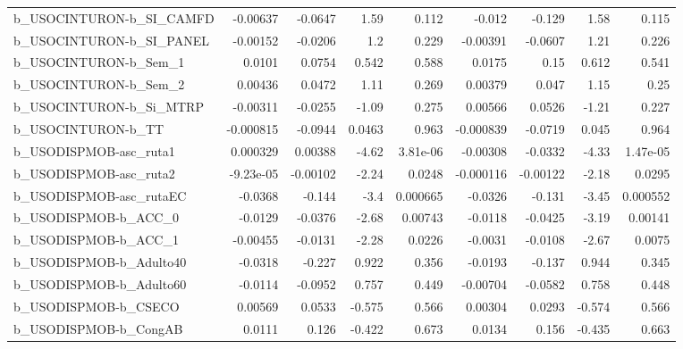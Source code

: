 \begin{tabular}{lrrrrrrrr}
b\_USOCINTURON-b\_SI\_CAMFD   &    -0.00637 &      -0.0647 &     1.59 &    0.112 &     -0.012 &      -0.129 &         1.58 &         0.115 \\
b\_USOCINTURON-b\_SI\_PANEL   &    -0.00152 &      -0.0206 &      1.2 &    0.229 &   -0.00391 &     -0.0607 &         1.21 &         0.226 \\
b\_USOCINTURON-b\_Sem\_1      &      0.0101 &       0.0754 &    0.542 &    0.588 &     0.0175 &        0.15 &        0.612 &         0.541 \\
b\_USOCINTURON-b\_Sem\_2      &     0.00436 &       0.0472 &     1.11 &    0.269 &    0.00379 &       0.047 &         1.15 &          0.25 \\
b\_USOCINTURON-b\_Si\_MTRP    &    -0.00311 &      -0.0255 &    -1.09 &    0.275 &    0.00566 &      0.0526 &        -1.21 &         0.227 \\
b\_USOCINTURON-b\_TT         &   -0.000815 &      -0.0944 &   0.0463 &    0.963 &  -0.000839 &     -0.0719 &        0.045 &         0.964 \\
b\_USODISPMOB-asc\_ruta1     &    0.000329 &      0.00388 &    -4.62 & 3.81e-06 &   -0.00308 &     -0.0332 &        -4.33 &      1.47e-05 \\
b\_USODISPMOB-asc\_ruta2     &   -9.23e-05 &     -0.00102 &    -2.24 &   0.0248 &  -0.000116 &    -0.00122 &        -2.18 &        0.0295 \\
b\_USODISPMOB-asc\_rutaEC    &     -0.0368 &       -0.144 &     -3.4 & 0.000665 &    -0.0326 &      -0.131 &        -3.45 &      0.000552 \\
b\_USODISPMOB-b\_ACC\_0       &     -0.0129 &      -0.0376 &    -2.68 &  0.00743 &    -0.0118 &     -0.0425 &        -3.19 &       0.00141 \\
b\_USODISPMOB-b\_ACC\_1       &    -0.00455 &      -0.0131 &    -2.28 &   0.0226 &    -0.0031 &     -0.0108 &        -2.67 &        0.0075 \\
b\_USODISPMOB-b\_Adulto40    &     -0.0318 &       -0.227 &    0.922 &    0.356 &    -0.0193 &      -0.137 &        0.944 &         0.345 \\
b\_USODISPMOB-b\_Adulto60    &     -0.0114 &      -0.0952 &    0.757 &    0.449 &   -0.00704 &     -0.0582 &        0.758 &         0.448 \\
b\_USODISPMOB-b\_CSECO       &     0.00569 &       0.0533 &   -0.575 &    0.566 &    0.00304 &      0.0293 &       -0.574 &         0.566 \\
b\_USODISPMOB-b\_CongAB      &      0.0111 &        0.126 &   -0.422 &    0.673 &     0.0134 &       0.156 &       -0.435 &         0.663 \\

\end{tabular}

